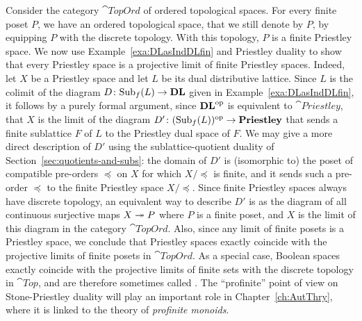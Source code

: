 \begin{example}\label{exa:priestley-as-profinite posets}
Consider the category $\cat{TopOrd}$ of ordered topological spaces. For every
finite poset $P$, we have an ordered topological space, that we still denote by
$P$, by equipping $P$ with the discrete topology. With this topology, $P$ is a
finite Priestley space. We now use Example~\ref{exa:DLasIndDLfin} and Priestley
duality to show that every Priestley space is a projective limit of finite
Priestley spaces. Indeed, let $X$ be a Priestley space and let $L$ be its dual
distributive lattice.  Since $L$ is the colimit of the diagram $D \colon
\mathrm{Sub}_f(L) \to \mathbf{DL}$ given in Example~\ref{exa:DLasIndDLfin}, it follows by a
purely formal argument, since $\mathbf{DL}^{\mathrm{op}}$ is equivalent to $\cat{Priestley}$,
that $X$ is the limit of the diagram $D' \colon (\mathrm{Sub}_f(L))^{\mathrm{op}} \to
\mathbf{Priestley}$ that sends a finite sublattice $F$ of $L$ to the Priestley dual
space of $F$. We may give a more direct description of $D'$ using the
sublattice-quotient duality of Section~\ref{sec:quotients-and-subs}: the domain
of $D'$ is (isomorphic to) the poset of compatible pre-orders $\preceq$ on $X$
for which $X/{\preceq}$ is finite, and it sends such a pre-order $\preceq$ to
the finite Priestley space $X/{\preceq}$.  Since finite Priestley spaces always
have discrete topology, an equivalent way to describe $D'$ is as the diagram of
all continuous surjective maps $X \twoheadrightarrow P$ where $P$ is a finite poset, and $X$
is the limit of this diagram in the category $\cat{TopOrd}$. Also, since any limit of
finite posets is a Priestley space, we conclude that Priestley spaces exactly coincide
with the projective limits of finite posets in $\cat{TopOrd}$. As a special case,
Boolean spaces exactly coincide with the projective limits of finite sets with the
discrete topology in $\cat{Top}$, and are therefore sometimes called .
The ``profinite'' point of view on Stone-Priestley duality will play an important role
in Chapter~\ref{ch:AutThry}, where it is linked to the theory of \emph{profinite monoids}.
\end{example}
